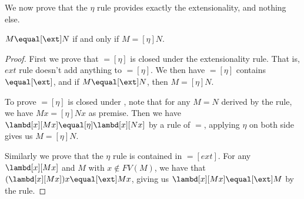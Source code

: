 \documentclass[../../../include/open-logic-section]{subfiles}
\begin{document}
We now prove that the $\eta$ rule provides exactly the extensionality,
and nothing else.

\begin{thm}
  $M \equal[\ext] N$ if and only if $M \equal[\eta] N$.
\end{thm}

\begin{proof}
  First we prove that $\equal[\eta]$ is closed under the
  extensionality rule. That is, $ext$ rule doesn't add anything to
  $\equal[\eta]$. We then have $\equal[\eta]$ contains $\equal[\ext]$,
  and if $M \equal[\ext] N$, then $M \equal[\eta] N$.

  To prove $\equal[\eta]$ is closed under \ext, note that for any $M
  \equal N$ derived by the \ext{} rule, we have $Mx
  \equal[\eta] Nx$ as premise. Then we have $\lambd[x][Mx]
  \equal[\eta] \lambd[x][Nx]$ by a rule of $\equal$, applying $\eta$
  on both side gives us $M \equal[\eta] N$.

  Similarly we prove that the $\eta$ rule is contained in
  $\equal[ext]$. For any $\lambd[x][Mx]$ and $M$ with $x \notin
  FV(M)$, we have that $(\lambd[x][Mx])x \equal[\ext] Mx$,
  giving us $\lambd[x][Mx] \equal[\ext] M$ by the \ext{} rule.
\end{proof}
\end{document}
